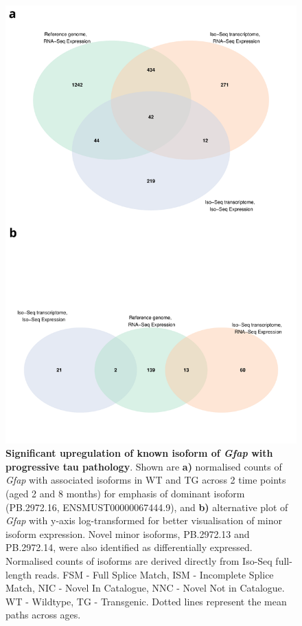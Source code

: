 \begin{figure}[!htp]
	\centering
	\includegraphics[page=4,scale = 0.55]{Figures/WholeDifferentialAnalysis.pdf}
	\captionsetup{width=0.95\textwidth}
	\caption[Differential Isoform Expression: Changes in transcript expression of isoforms associated with \textit{Gfap}]%
	{\textbf{Significant upregulation of known isoform of \textit{Gfap} with progressive tau pathology}. Shown are \textbf{a)} normalised counts of \textit{Gfap} with associated isoforms in WT and TG across 2 time points (aged 2 and 8 months) for emphasis of dominant isoform (PB.2972.16, ENSMUST00000067444.9), and \textbf{b)} alternative plot of \textit{Gfap} with y-axis log-transformed for better visualisation of minor isoform expression. Novel minor isoforms, PB.2972.13 and PB.2972.14, were also identified as differentially expressed. Normalised counts of isoforms are derived directly from Iso-Seq full-length reads. FSM - Full Splice Match, ISM - Incomplete Splice Match, NIC - Novel In Catalogue, NNC - Novel Not in Catalogue. WT - Wildtype, TG - Transgenic. Dotted lines represent the mean paths across ages.} 
	\label{fig:DEI_gfap}
\end{figure}

